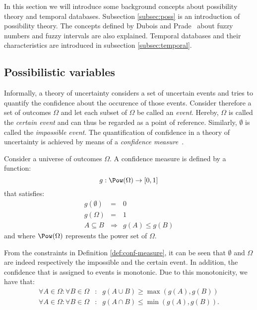 %
%

In this section we will introduce some background concepts about possibility theory and temporal databases. Subsection \ref{subsec:poss} is an introduction of possibility theory. The concepts defined by Dubois and Prade~\cite{Dubois1983} about fuzzy numbers and fuzzy intervals are also explained. Temporal databases and their characteristics are introduced in subsection \ref{subsec:temporal}.




\subsection{\label{subsec:poss}Possibilistic variables}
Informally, a theory of uncertainty considers a set of uncertain events and tries to quantify the confidence about the occurence of those events. Consider therefore a set of outcomes $\Omega$ and let each subset of $\Omega$ be called an \emph{event}. Hereby, $\Omega$ is called the \emph{certain event} and can thus be regarded as a point of reference. Similarly, $\emptyset$ is called the \emph{impossible event}. The quantification of confidence in a theory of uncertainty is achieved by means of a \emph{confidence measure}~\cite{Choquet53}.
\begin{definition}
\label{def:conf-measure}
Consider a universe of outcomes $\Omega$. A confidence measure is defined by a function:
\begin{equation}
g:\Pow(\Omega)\rightarrow[0,1]
\end{equation}
that satisfies:
\begin{eqnarray}
g\left(\emptyset\right)&=&0\\
g\left(\Omega\right)&=&1\\
A\subseteq B&\Rightarrow&g(A)\leq g(B)
\end{eqnarray}
and where $\Pow(\Omega)$ represents the power set of $\Omega$.
\end{definition}
From the constraints in Definition \ref{def:conf-measure}, it can be seen that $\emptyset$ and $\Omega$ are indeed respectively the impossible and the certain event. In addition, the confidence that is assigned to events is monotonic. Due to this monotonicity, we have that:
\begin{eqnarray}
\forall A\in\Omega:\forall B\in\Omega&:&g\left(A\cup B\right)\geq\max\left(g\left(A\right),g\left(B\right)\right)\\
\forall A\in\Omega:\forall B\in\Omega&:&g\left(A\cap B\right)\leq\min\left(g\left(A\right),g\left(B\right)\right).
\end{eqnarray}
